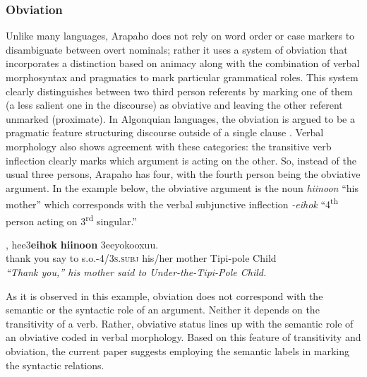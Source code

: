 \documentclass[11pt]{article}
\begin{document}
 \subsubsection{Obviation}
Unlike many languages, Arapaho does not rely on word order or case markers to disambiguate between overt nominals; rather it uses a system of obviation that incorporates a distinction based on animacy along with the combination of verbal morphosyntax and pragmatics to mark particular grammatical roles. This system clearly distinguishes between two third person referents by marking one of them (a less salient one in the discourse) as obviative and leaving the other referent unmarked (proximate). In Algonquian languages, the obviation is argued to be a pragmatic feature structuring discourse outside of a single clause \cite{Goddard1984}. Verbal morphology also shows agreement with these categories: the transitive verb inflection clearly marks which argument is acting on  the other. So, instead of the usual three persons, Arapaho has four, with the fourth person being the obviative argument. In the example below, the obviative argument is the noun \textit{hiinoon} ``his mother'' which corresponds with the verbal subjunctive inflection \textit{-eihok} ``4\textsuperscript{th} person acting on 3\textsuperscript{rd} singular.'' 

\small
\begin{exe}
\ex \label{obviation}
, {hee3\textbf{eihok}} {\textbf{hiinoon}} {3eeyokooxuu}.\\
{thank you} {say to s.o.-\textsc{4/3s.subj}} {his/her mother} {Tipi-pole Child} \\
\trans \textit{``Thank you,'' his mother said to Under-the-Tipi-Pole Child.}
\end{exe}
\normalsize
As it is observed in this example, obviation does not correspond with the semantic or the syntactic role of an argument. Neither it depends on the transitivity of a verb. Rather, obviative status lines up with the semantic role of an obviative coded in verbal morphology. Based on this feature of transitivity and obviation, the current paper suggests employing the semantic labels in marking the syntactic relations. 
\end{document}
